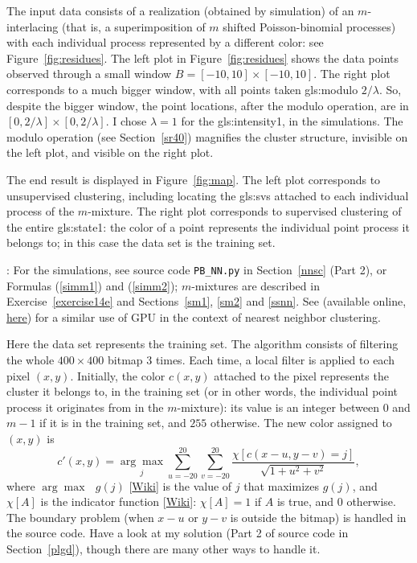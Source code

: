 \documentclass[10pt]{article}
\begin{document}
The input data consists of a realization (obtained by simulation) of an
\textcolor{index}{$m$-interlacing} (that is, a superimposition of $m$ shifted Poisson-binomial processes) with each individual process represented by a different color: see Figure~\ref{fig:residues}. The left plot in Figure~\ref{fig:residues} shows the data points observed through a small window $B=[-10,10]\times[-10,10]$. The right plot corresponds to a much bigger window, with all points taken \gls{gls:modulo} $2/\lambda$. So, despite the bigger window, the point locations, after the modulo operation, are in $[0, 2/\lambda]\times[0, 2/\lambda]$. I chose $\lambda=1$ for the
\gls{gls:intensity1}, in the simulations. The modulo operation (see Section~\ref{sr40}) magnifies the cluster structure, invisible on the left plot, and visible on the right plot.

The end result is displayed in Figure~\ref{fig:map}. The left plot corresponds to unsupervised clustering, including locating the
\glspl{gls:sv} attached to each
individual process of the $m$-mixture. The right plot corresponds to supervised clustering of the entire \gls{gls:state1}:  the color of a point represents the individual point process it belongs to; in this case the data set is the training set.

: For the simulations, see source code \texttt{PB\_NN.py} in Section~\ref{nnsc} (Part 2), or Formulas (\ref{simm1}) and (\ref{simm2}); $m$-mixtures are described in Exercise~\ref{exercise14e} and Sections~\ref{sm1}, \ref{sm2} and \ref{ssnn}. See \cite{vgar} (available online, \href{https://arxiv.org/abs/0804.1448}{here}) for a similar use of GPU in the context of nearest neighbor clustering. \\


\noindent Here the data set represents the training set. The algorithm consists of filtering the whole $400\times 400$ bitmap 3 times. Each time, a local filter is applied
to each pixel $(x,y)$. Initially, the color $c(x,y)$ attached to the pixel represents the cluster it belongs to, in the training set (or in other words, the individual point process it originates from in the $m$-mixture): its value
is an integer between $0$ and $m-1$ if it is in the training set, and $255$ otherwise.  The new color assigned to $(x,y)$ is
\begin{equation}
c'(x,y)=\underset{j}{\arg \max} \sum_{u=-20}^{20}\sum_{v=-20}^{20}\frac{\chi[c(x-u,y-v)=j]}{\sqrt{1+u^2+v^2}}, \label{filt786}
\end{equation}
where $\arg \max \mbox{ } g(j)$ [\href{https://en.wikipedia.org/wiki/Arg_max}{Wiki}] is the value of $j$ that maximizes $g(j)$,
and $\chi[A]$ is the indicator function [\href{https://en.wikipedia.org/wiki/Indicator_function}{Wiki}]: $\chi[A]=1$ if $A$ is true, and $0$ otherwise.
The boundary problem (when $x-u$ or $y-v$ is outside the bitmap) is handled in the source code. Have a look at my solution (Part 2 of source code
in Section~\ref{plgd}), though there are many other ways
to handle it.
\end{document}
